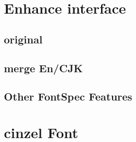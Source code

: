 \documentclass[lang=cn, font={sysfont}]{ztex}
\DeclareRobustCommand{\IBMPlexelseries}
  {
    \IBMPlex
    \fontseries{el}\selectfont
  }
\begin{document}
\section{Enhance interface}
\subsection{original}
\zhlipsum[1]

\subsection{merge En/CJK}
{\IBMPlex \lipsum[1][1-3]}

{\IBMPlex \zhlipsum[1]}


\subsection{Other FontSpec Features}
{\IBMPlexelseries \zhlipsum[1]\lipsum[1][1-2]}


\section{cinzel Font}
{\cinzel \lipsum[1][1-2]}

{\cinzel\itshape \lipsum[1][1-2]}
\end{document}
